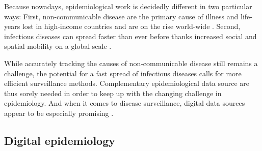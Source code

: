 \documentclass[11pt, a4paper,twoside]{report}\usepackage[]{graphicx}\usepackage[]{color}
\begin{document}
Because nowadays, epidemiological work is decidedly different in two particular ways: First, non-communicable disease are the primary cause of illness and life-years lost in high-income countries and are on the rise world-wide \citep{lozano_global_2013}. Second, infectious diseases can spread faster than ever before thanks increased social and spatial mobility on a global scale \citep{hufnagel_forecast_2004}.

While accurately tracking the causes of non-communicable disease still remains a challenge, the potential for a fast spread of infectious diseases calls for more efficient surveillance methods. Complementary epidemiological data source are thus sorely needed in order to keep up with the changing challenge in epidemiology. And when it comes to disease surveillance, digital data sources appear to be especially promising \citep{salathe_digital_2012, simonsen_infectious_2016}.

\subsection{Digital epidemiology}
\end{document}
